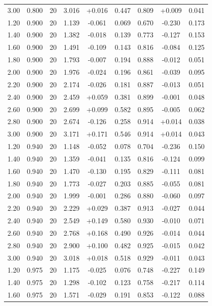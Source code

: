 \begin{longtable}{ccccccccc}
3.00 & 0.800 & 20 & 3.016 & +0.016 & 0.447 & 0.809 & +0.009 & 0.041 \\
1.20 & 0.900 & 20 & 1.139 & -0.061 & 0.069 & 0.670 & -0.230 & 0.173 \\
1.40 & 0.900 & 20 & 1.382 & -0.018 & 0.139 & 0.773 & -0.127 & 0.153 \\
1.60 & 0.900 & 20 & 1.491 & -0.109 & 0.143 & 0.816 & -0.084 & 0.125 \\
1.80 & 0.900 & 20 & 1.793 & -0.007 & 0.194 & 0.888 & -0.012 & 0.051 \\
2.00 & 0.900 & 20 & 1.976 & -0.024 & 0.196 & 0.861 & -0.039 & 0.095 \\
2.20 & 0.900 & 20 & 2.174 & -0.026 & 0.181 & 0.887 & -0.013 & 0.051 \\
2.40 & 0.900 & 20 & 2.459 & +0.059 & 0.381 & 0.899 & -0.001 & 0.048 \\
2.60 & 0.900 & 20 & 2.699 & +0.099 & 0.582 & 0.895 & -0.005 & 0.062 \\
2.80 & 0.900 & 20 & 2.674 & -0.126 & 0.258 & 0.914 & +0.014 & 0.038 \\
3.00 & 0.900 & 20 & 3.171 & +0.171 & 0.546 & 0.914 & +0.014 & 0.043 \\
1.20 & 0.940 & 20 & 1.148 & -0.052 & 0.078 & 0.704 & -0.236 & 0.150 \\
1.40 & 0.940 & 20 & 1.359 & -0.041 & 0.135 & 0.816 & -0.124 & 0.099 \\
1.60 & 0.940 & 20 & 1.470 & -0.130 & 0.195 & 0.829 & -0.111 & 0.081 \\
1.80 & 0.940 & 20 & 1.773 & -0.027 & 0.203 & 0.885 & -0.055 & 0.081 \\
2.00 & 0.940 & 20 & 1.999 & -0.001 & 0.286 & 0.880 & -0.060 & 0.097 \\
2.20 & 0.940 & 20 & 2.229 & +0.029 & 0.387 & 0.913 & -0.027 & 0.044 \\
2.40 & 0.940 & 20 & 2.549 & +0.149 & 0.580 & 0.930 & -0.010 & 0.071 \\
2.60 & 0.940 & 20 & 2.768 & +0.168 & 0.490 & 0.926 & -0.014 & 0.044 \\
2.80 & 0.940 & 20 & 2.900 & +0.100 & 0.482 & 0.925 & -0.015 & 0.042 \\
3.00 & 0.940 & 20 & 3.018 & +0.018 & 0.518 & 0.929 & -0.011 & 0.043 \\
1.20 & 0.975 & 20 & 1.175 & -0.025 & 0.076 & 0.748 & -0.227 & 0.149 \\
1.40 & 0.975 & 20 & 1.298 & -0.102 & 0.123 & 0.758 & -0.217 & 0.114 \\
1.60 & 0.975 & 20 & 1.571 & -0.029 & 0.191 & 0.853 & -0.122 & 0.088 \\

\end{longtable}
